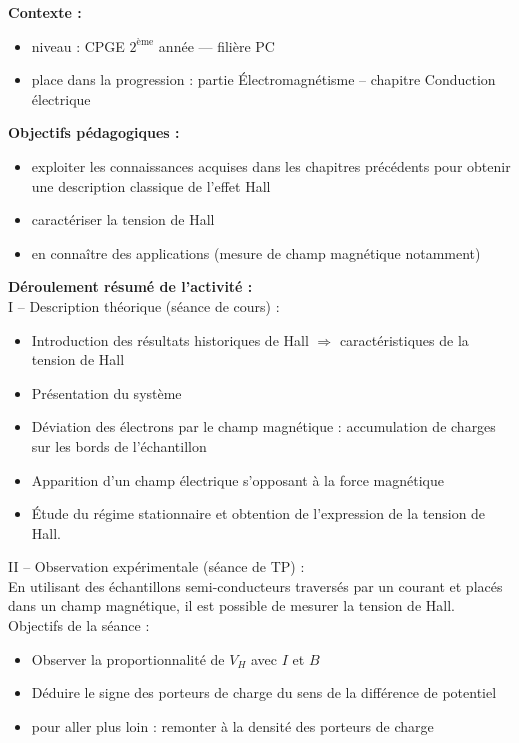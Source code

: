 \documentclass[a4paper,11pt]{article} %
\newenvironment{encart}[1]{%
	\begin{tcolorbox}
		[
		breakable, enhanced jigsaw, %
		arc = 1mm, %
		title = \textbf{#1}, %
		coltitle = white, %
		colbacktitle = blue, %
		colback = white, %
		colframe = blue %
		]
}{		
	\end{tcolorbox}
}
\begin{document}
	\begin{encart}{Activité pédagogique 1 : étude de l'effet Hall classique}
		\textbf{Contexte :}
		\begin{itemize}
			\item niveau : CPGE $ 2^\text{ème} $ année --- filière PC
			\item place dans la progression : partie \'Electromagnétisme -- chapitre Conduction électrique
		\end{itemize}
		\vspace{0.5cm}
		
		\textbf{Objectifs pédagogiques :}
		\begin{itemize}
			\item exploiter les connaissances acquises dans les chapitres précédents pour obtenir une description classique de l'effet Hall
			\item caractériser la tension de Hall
			\item en connaître des applications (mesure de champ magnétique notamment)
		\end{itemize}
		\vspace{0.5cm}
		
		\textbf{Déroulement résumé de l'activité :}\\
		I -- Description théorique (séance de cours) :
		\begin{itemize}
			\item Introduction des résultats historiques de Hall $ \Rightarrow $ caractéristiques de la tension de Hall
			\item Présentation du système
			\item Déviation des électrons par le champ magnétique : accumulation de charges sur les bords de l'échantillon
			\item Apparition d'un champ électrique s'opposant à la force magnétique
			\item \'Etude du régime stationnaire et obtention de l'expression de la tension de Hall.
		\end{itemize}
		\vspace{0.5cm}
		
		II -- Observation expérimentale (séance de TP) :\\
		En utilisant des échantillons semi-conducteurs traversés par un courant et placés dans un champ magnétique, il est possible de mesurer la tension de Hall.\\
		Objectifs de la séance :
		\begin{itemize}
			\item Observer la proportionnalité de $ V_H $ avec $ I $ et $ B $
			\item Déduire le signe des porteurs de charge du sens de la différence de potentiel
			\item pour aller plus loin : remonter à la densité des porteurs de charge
		\end{itemize}
		

\end{encart}
\end{document}

